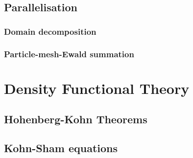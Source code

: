 \subsection{Parallelisation}

\subsubsection{Domain decomposition}

\subsubsection{Particle-mesh-Ewald summation} \label{sec:pme}

%
%
\section{Density Functional Theory} \label{chapter:onetep}

\subsection{Hohenberg-Kohn Theorems}

\subsection{Kohn-Sham equations}